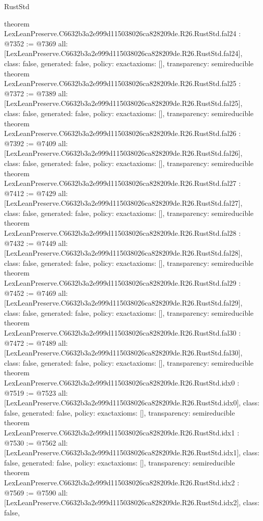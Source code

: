 \begin{lexlean}{RustStd}
\begin{coremodule}
{}
theorem LexLeanPreserve.C6632b3a2e999d115038026ca828209de.R26.RustStd.fal24 : @7352 := @7369 {
  all: [LexLeanPreserve.C6632b3a2e999d115038026ca828209de.R26.RustStd.fal24],
  class: false,
  generated: false,
  policy: exact{axioms: []},
  transparency: semireducible
}
theorem LexLeanPreserve.C6632b3a2e999d115038026ca828209de.R26.RustStd.fal25 : @7372 := @7389 {
  all: [LexLeanPreserve.C6632b3a2e999d115038026ca828209de.R26.RustStd.fal25],
  class: false,
  generated: false,
  policy: exact{axioms: []},
  transparency: semireducible
}
theorem LexLeanPreserve.C6632b3a2e999d115038026ca828209de.R26.RustStd.fal26 : @7392 := @7409 {
  all: [LexLeanPreserve.C6632b3a2e999d115038026ca828209de.R26.RustStd.fal26],
  class: false,
  generated: false,
  policy: exact{axioms: []},
  transparency: semireducible
}
theorem LexLeanPreserve.C6632b3a2e999d115038026ca828209de.R26.RustStd.fal27 : @7412 := @7429 {
  all: [LexLeanPreserve.C6632b3a2e999d115038026ca828209de.R26.RustStd.fal27],
  class: false,
  generated: false,
  policy: exact{axioms: []},
  transparency: semireducible
}
theorem LexLeanPreserve.C6632b3a2e999d115038026ca828209de.R26.RustStd.fal28 : @7432 := @7449 {
  all: [LexLeanPreserve.C6632b3a2e999d115038026ca828209de.R26.RustStd.fal28],
  class: false,
  generated: false,
  policy: exact{axioms: []},
  transparency: semireducible
}
theorem LexLeanPreserve.C6632b3a2e999d115038026ca828209de.R26.RustStd.fal29 : @7452 := @7469 {
  all: [LexLeanPreserve.C6632b3a2e999d115038026ca828209de.R26.RustStd.fal29],
  class: false,
  generated: false,
  policy: exact{axioms: []},
  transparency: semireducible
}
theorem LexLeanPreserve.C6632b3a2e999d115038026ca828209de.R26.RustStd.fal30 : @7472 := @7489 {
  all: [LexLeanPreserve.C6632b3a2e999d115038026ca828209de.R26.RustStd.fal30],
  class: false,
  generated: false,
  policy: exact{axioms: []},
  transparency: semireducible
}
theorem LexLeanPreserve.C6632b3a2e999d115038026ca828209de.R26.RustStd.idx0 : @7519 := @7523 {
  all: [LexLeanPreserve.C6632b3a2e999d115038026ca828209de.R26.RustStd.idx0],
  class: false,
  generated: false,
  policy: exact{axioms: []},
  transparency: semireducible
}
theorem LexLeanPreserve.C6632b3a2e999d115038026ca828209de.R26.RustStd.idx1 : @7530 := @7562 {
  all: [LexLeanPreserve.C6632b3a2e999d115038026ca828209de.R26.RustStd.idx1],
  class: false,
  generated: false,
  policy: exact{axioms: []},
  transparency: semireducible
}
theorem LexLeanPreserve.C6632b3a2e999d115038026ca828209de.R26.RustStd.idx2 : @7569 := @7590 {
  all: [LexLeanPreserve.C6632b3a2e999d115038026ca828209de.R26.RustStd.idx2],
  class: false,
}
\end{coremodule}
\end{lexlean}
